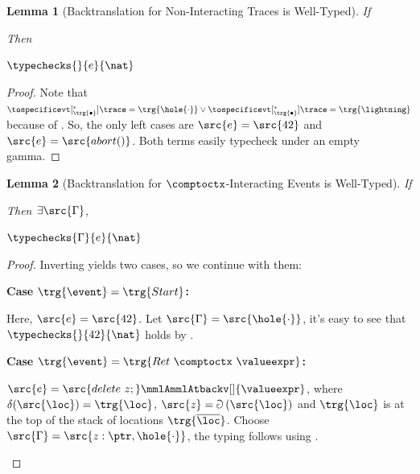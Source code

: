 \documentclass[a4paper,names,dvipsnames]{article}
\newtheorem{lemma}{Lemma}
\begin{document}
\begin{lemma}[Backtranslation for Non-Interacting Traces is Well-Typed]\label{lem:expr:backtranslation:welltyped}
  If
  Then
  \begin{goals}
  \item $\typechecks{}{e}{\nat}$
  \end{goals}
\end{lemma}
\begin{proof}
  Note that $\tospecificevt[^{*}_{\trg{\bullet}}]{\trace}=\trg{\hole{\cdot}}\vee\tospecificevt[^{*}_{\trg{\bullet}}]{\trace}=\trg{\lightning}$ because of .
  So, the only left cases are $\src{e}=\src{42}$ and $\src{e}=\src{abort()}$.
  Both terms easily typecheck under an empty gamma.
\end{proof}

\begin{lemma}[Backtranslation for $\comptoctx$-Interacting Events is Well-Typed]\label{lem:expr:interact:comptoctx:backtranslation:welltyped}
  If
  Then $\exists \src{\Gamma}$,
  \begin{goals}
  \item $\typechecks{\Gamma}{e}{\nat}$
  \end{goals}
\end{lemma}
\begin{proof}
  Inverting  yields two cases, so we continue with them:
  \begin{description}
    \item \textbf{Case }$\trg{\event} = \trg{Start}$\textbf{:}

    Here, $\src{e} = \src{42}$. Let $\src{\Gamma} = \src{\hole{\cdot}}$, it's easy to see that $\typechecks{}{42}{\nat}$ holds by .

    \item \textbf{Case }$\trg{\event} = \trg{Ret\ \comptoctx\ \valueexpr}$\textbf{:}

    $\src{e} = \src{delete\ z;}\mmlAmmlAtbackv[]{\valueexpr}$, where $\delta(\src{\loc})=\trg{\loc}$, $\src{z} = \Game\left(\src{\loc}\right)$ and $\trg{\loc}$ is at the top of the stack of locations $\trg{\overline{\loc}}$.
    Choose $\src{\Gamma} = \src{z:\ptr,\hole{\cdot}}$, the typing follows using .
  \end{description}
\end{proof}
\end{document}
